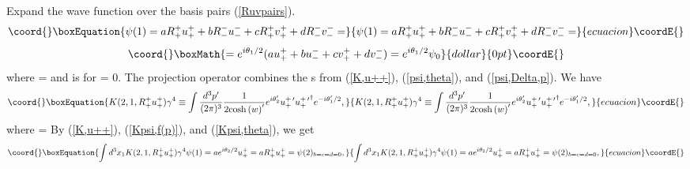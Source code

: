 \documentclass[a4paper,12pt]{article}
\begin{document}
	Expand the wave function \coordHE{} over the basis pairs (\ref{Ruvpairs}). 
\begin{equation}\coord{}\boxEquation{	\label{psi(1),theta}
\psi(1) = a R_{+}^{+} u_{+}^{+} + bR_{-}^{-} u_{-}^{-} + cR_{+}^{+} v_{+}^{+} + dR_{-}^{-} v_{-}^{-} =
}{	\psi(1) = a R_{+}^{+} u_{+}^{+} + bR_{-}^{-} u_{-}^{-} + cR_{+}^{+} v_{+}^{+} + dR_{-}^{-} v_{-}^{-} =
}{ecuacion}\coordE{}\end{equation}  
$$\coord{}\boxMath{
 =  e^{i \theta_{1} / 2}(a  u_{+}^{+}  + b  u_{-}^{-} + c  v_{+}^{+}  + d  v_{-}^{-}) = e^{i \theta_{1} / 2} \psi_{0}
}{dollar}{0pt}\coordE{}$$
where \coordHE{} = \coordHE{} and \coordHE{} is \coordHE{} for \coordHE{} = 0. The \coordHE{} projection operator combines the \coordHE{}s from (\ref{K,u++}), (\ref{psi,theta}), and (\ref{psi,Delta,p}). We have
\begin{equation}\coord{}\boxEquation{	\label{K(2,1)}
  K(2,1,R_{+}^{+} u_{+}^{+}) \gamma^{4} \equiv \int \frac{d^3 p^{\prime} }{(2 \pi)^3} \frac{1}{2 {\cosh{(w)}}^{\prime}}e^{i \theta_{2}^{\prime}}  u_{+}^{+ \, \prime} {u_{+}^{+ \, \prime }}^{\dagger} e^{ -i \theta_{1}^{\prime}/2} ,
}{	K(2,1,R_{+}^{+} u_{+}^{+}) \gamma^{4} \equiv \int \frac{d^3 p^{\prime} }{(2 \pi)^3} \frac{1}{2 {\cosh{(w)}}^{\prime}}e^{i \theta_{2}^{\prime}}  u_{+}^{+ \, \prime} {u_{+}^{+ \, \prime }}^{\dagger} e^{ -i \theta_{1}^{\prime}/2} ,
}{ecuacion}\coordE{}\end{equation} 
where \coordHE{} = \coordHE{}  By (\ref{K,u++}), (\ref{Kpsi,f(p)}), and (\ref{Kpsi,theta}), we get 
\begin{equation}\coord{}\boxEquation{	\label{K(2,1)psi}
 \int d^{3} x_{1} K(2,1,R_{+}^{+} u_{+}^{+}) \gamma^{4} \psi(1) = a e^{i \theta_{2} / 2} u_{+}^{+} = aR_{+}^{+} u_{+}^{+} = \psi(2)_{b=c=d=0},
}{	\int d^{3} x_{1} K(2,1,R_{+}^{+} u_{+}^{+}) \gamma^{4} \psi(1) = a e^{i \theta_{2} / 2} u_{+}^{+} = aR_{+}^{+} u_{+}^{+} = \psi(2)_{b=c=d=0},
}{ecuacion}\coordE{}\end{equation} 
\end{document}
